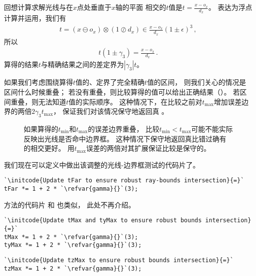 回想计算求解光线与在$x$点处垂直于$x$轴的平面
相交的$t$值是$\displaystyle t=\frac{x-o_x}{d_x}$。
表达为浮点计算并运用，我们有
\begin{align*}
    t=(x\ominus o_x)\otimes(1\oslash d_x)\in\frac{x-o_x}{d_x}(1\pm\epsilon)^3\, ,
\end{align*}
所以
\begin{align*}
    t(1\pm\gamma_3)=\frac{x-o_x}{d_x}\, .
\end{align*}
算得的结果$t$与精确结果之间的差定界为$|\gamma_3|t$。

如果我们考虑围绕算得$t$值的、定界了完全精确$t$值的区间，
则我们关心的情况是区间什么时候重叠；
若没有重叠，则比较算得的值可以给出正确结果（）。
若区间重叠，则无法知道$t$值的实际顺序。
这种情况下，在比较之前对$t_{\max}$增加误差边界的两倍$2\gamma_3t_{\max}$，
保证我们对该情况保守地返回真
。
\begin{figure}[htbp]
    \centering
    \caption{如果算得的$t_{\min}$和$t_{\max}$的误差边界重叠，
    比较$t_{\min}<t_{\max}$可能不能实际反映出光线是否命中边界框。
    这种情况下保守地返回真比错过确有的相交更好。
    用$t_{\max}$误差的两倍对其扩展保证比较是保守的。}
    \label{fig:3.42}
\end{figure}

我们现在可以定义中做出该调整的光线-边界框测试的代码片了。
\begin{lstlisting}
`\initcode{Update tFar to ensure robust ray-bounds intersection}{=}`
tFar *= 1 + 2 * `\refvar{gamma}{}`(3);
\end{lstlisting}

方法的代码片
和
也类似，
此处不再介绍。
\begin{lstlisting}
`\initcode{Update tMax and tyMax to ensure robust bounds intersection}{=}`
tMax *= 1 + 2 * `\refvar{gamma}{}`(3);
tyMax *= 1 + 2 * `\refvar{gamma}{}`(3);
\end{lstlisting}
\begin{lstlisting}
`\initcode{Update tzMax to ensure robust bounds intersection}{=}`
tzMax *= 1 + 2 * `\refvar{gamma}{}`(3);
\end{lstlisting}

